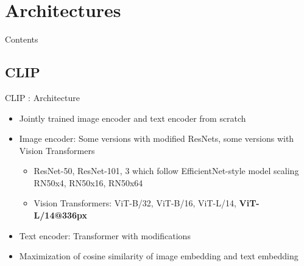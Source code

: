 \documentclass[xcolor=dvipsnames]{beamer}
\begin{document}
\section{Architectures}
\begin{frame}{Contents}
  \tableofcontents[sections={1-3}, currentsection]
  \tableofcontents[sections={4-6}]
\end{frame}


\subsection{CLIP}
\begin{frame}{CLIP \parencite{radford2021learning}: Architecture}
  \begin{itemize}
    \item Jointly trained image encoder and text encoder from scratch
    \item Image encoder: Some versions with modified ResNets, some versions with Vision Transformers \parencite[ViT;][]{ImageT}
    \begin{itemize}
      \item ResNet-50, ResNet-101, 3 which follow EfficientNet-style model scaling RN50x4, RN50x16, RN50x64
      \item Vision Transformers: ViT-B/32, ViT-B/16, ViT-L/14, \textbf{ViT-L/14@336px}
    \end{itemize}
    \item Text encoder: Transformer with modifications
    \item Maximization of cosine similarity of image embedding and text embedding
  \end{itemize}
\end{frame}
\end{document}

